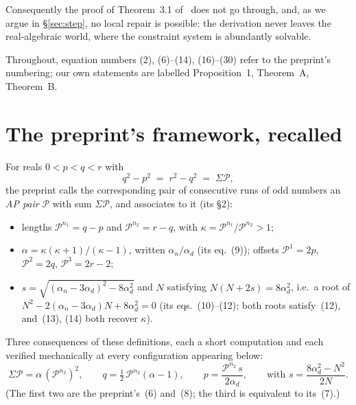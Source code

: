 \documentclass[11pt]{amsart}
\theoremstyle{remark}
\newcommand{\cP}{\mathcal{P}}
\begin{document}
Consequently the proof of Theorem~3.1 of~\cite{Hill} does not go
through, and, as we argue in \S\ref{sec:step}, no local repair is
possible: the derivation never leaves the real-algebraic world, where
the constraint system is abundantly solvable.

Throughout, equation numbers (2), (6)--(14), (16)--(30) refer to the
preprint's numbering; our own statements are labelled Proposition~1,
Theorem~A, Theorem~B.

\section{The preprint's framework, recalled}\label{sec:framework}

For reals $0 < p < q < r$ with
\begin{equation*}
q^2 - p^2 \;=\; r^2 - q^2 \;=\; \Sigma\cP,
\end{equation*}
the preprint calls the corresponding pair of consecutive runs of odd
numbers an \emph{AP pair} $\cP$ with sum $\Sigma\cP$, and associates to
it (its \S2):
\begin{itemize}
\item lengths $\cP^{n_1} = q - p$ and $\cP^{n_2} = r - q$, with
  $\kappa = \cP^{n_1}/\cP^{n_2} > 1$;
\item $\alpha = \kappa(\kappa+1)/(\kappa-1)$, written
  $\alpha_n/\alpha_d$ (its eq.~(9)); offsets $\cP^1 = 2p$,
  $\cP^2 = 2q$, $\cP^3 = 2r - 2$;
\item $s = \sqrt{(\alpha_n - 3\alpha_d)^2 - 8\alpha_d^2}$ and $N$
  satisfying $N(N + 2s) = 8\alpha_d^2$, i.e.\ a root of
  $N^2 - 2(\alpha_n - 3\alpha_d)N + 8\alpha_d^2 = 0$ (its
  eqs.~(10)--(12); both roots satisfy~(12), and~(13), (14) both recover
  $\kappa$).
\end{itemize}
Three consequences of these definitions, each a short computation and
each verified mechanically at every configuration appearing below:
\begin{equation}\label{eq:star}
\Sigma\cP = \alpha\,(\cP^{n_2})^2, \qquad
q = \tfrac12\,\cP^{n_2}(\alpha - 1), \qquad
p = \frac{\cP^{n_2}\,s}{2\alpha_d},
\qquad\text{with } s = \frac{8\alpha_d^2 - N^2}{2N}.
\tag{$*$}
\end{equation}
(The first two are the preprint's~(6) and~(8); the third is equivalent
to its~(7).)
\end{document}
